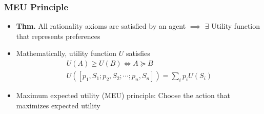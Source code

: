 \subsubsection*{MEU Principle}
\begin{itemize}
    \item \textbf{Thm.} All rationality axioms are satisfied by an agent $\implies$ $\exists$ Utility function that represents preferences
    \item Mathematically, utility function $U$ satisfies
    \begin{equation}
        \begin{array}{c}
            U(A)\geq U(B)\iff A\succeq B \\
            U([p_1,S_1;p_2,S_2;\cdots;p_n,S_n])=\sum_{i}p_iU(S_i)
        \end{array}
    \end{equation}
    \item Maximum expected utility (MEU) principle: Choose the action that maximizes expected utility
\end{itemize}
